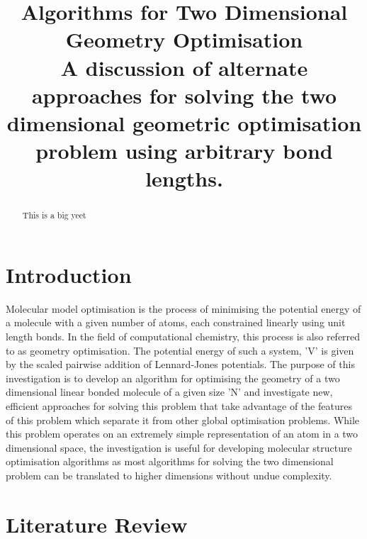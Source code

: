 \documentclass[conference]{IEEEtran}
\begin{document}
\title{Algorithms for Two Dimensional Geometry Optimisation\\
{\footnotesize \textsuperscript{}A discussion of alternate approaches for solving the two dimensional geometric optimisation problem using arbitrary bond lengths.}
}

\author{
}

\maketitle

\begin{abstract}
This is a big yeet
\end{abstract}

\section{Introduction}

Molecular model optimisation is the process of minimising the potential energy of a 
molecule with a given number of atoms, each constrained linearly using unit length bonds.
In the field of computational chemistry, this process is also referred to as geometry 
optimisation. The potential energy of such a system, 'V' is given by the scaled pairwise
addition of Lennard-Jones potentials. The purpose of this investigation is to develop an
algorithm for optimising the geometry of a two dimensional linear bonded molecule of a 
given size 'N' and investigate new, efficient approaches for solving this problem that
take advantage of the features of this problem which separate it from other global
optimisation problems. While this problem operates on an extremely simple representation
of an atom in a two dimensional space, the investigation is useful for developing molecular
structure optimisation algorithms as most algorithms for solving the two dimensional
problem can be translated to higher dimensions without undue complexity.

\section{Literature Review}
\end{document}
